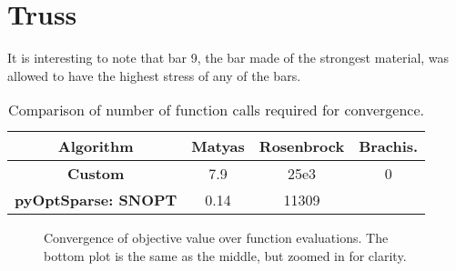 \documentclass{article}
\begin{document}
\begin{figure}[htbp]
	\centering
	\caption{\label{fig:dimensions}}
\end{figure}


\section{Truss}
It is interesting to note that bar 9, the bar made of the strongest material, was allowed to have the highest stress of any of the bars.

\begin{table}[htb]
	\begin{center}
		\caption{Comparison of number of function calls required for convergence.\label{tab:mytable}}
		\begin{tabular}{c c c c}
			\toprule
			\textbf{Algorithm} & Matyas & Rosenbrock & Brachis. \\
			\midrule
			\textbf{Custom} & 7.9 & 25e3 & 0 \\
			\textbf{pyOptSparse: SNOPT} & 0.14 & 11309 \\
			\bottomrule
		\end{tabular}
	\end{center}
\end{table}

\begin{figure}[htbp]
	\centering
	\caption{Convergence of objective value over function evaluations. The bottom plot is the same as the middle, but zoomed in for clarity.\label{fig:results}}
\end{figure}

\end{document}
